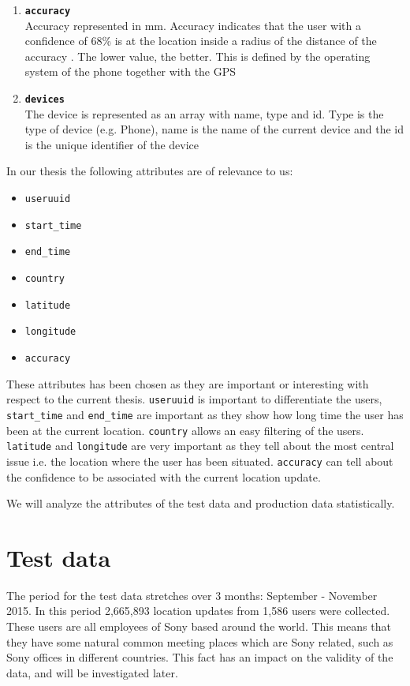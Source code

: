 \begin{enumerate}
\item \texttt{\textbf{accuracy}}\\Accuracy represented in mm. Accuracy indicates that the user with a confidence of 68\% is at the location inside a radius of the distance of the accuracy \cite{android_accuracy}. The lower value, the better. This is defined by the operating system of the phone together with the GPS 
\item \texttt{\textbf{devices}}\\The device is represented as an array with name, type and id. Type is the type of device (e.g. Phone), name is the name of the current device and the id is the unique identifier of the device 
\end{enumerate}

In our thesis the following attributes are of relevance to us: 

\begin{itemize}
\item \texttt{useruuid}
\item \texttt{start\_time}
\item \texttt{end\_time}
\item \texttt{country}
\item \texttt{latitude}
\item \texttt{longitude}
\item \texttt{accuracy}
\end{itemize}

These attributes has been chosen as they are important or interesting with respect to the current thesis. \texttt{useruuid} is important to differentiate the users, \texttt{start\_time} and \texttt{end\_time} are important as they show how long time the user has been at the current location. \texttt{country} allows an easy filtering of the users. \texttt{latitude} and \texttt{longitude} are very important as they tell about the most central issue i.e. the location where the user has been situated. \texttt{accuracy} can tell about the confidence to be associated with the current location update.  

We will analyze the attributes of the test data and production data statistically.

\section{Test data}
The period for the test data stretches over 3 months: September - November 2015.   
In this period 2,665,893 location updates from 1,586 users were collected. These users are all employees of Sony based around the world. This means that they have some natural common meeting places which are Sony related, such as Sony offices in different countries.
This fact has an impact on the validity of the data, and will be investigated later.


